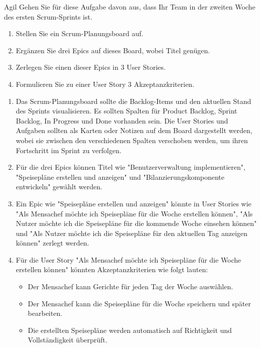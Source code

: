 \documentclass{article}
\begin{document}
\begin{exercise}{Agil}
  Gehen Sie für diese Aufgabe davon aus, dass Ihr Team in der zweiten Woche des ersten Scrum-Sprints ist.
  \begin{enumerate}
    \item Stellen Sie ein Scrum-Planungsboard auf.
    \item Ergänzen Sie drei Epics auf dieses Board, wobei Titel genügen.
    \item Zerlegen Sie einen dieser Epics in 3 User Stories.
    \item Formulieren Sie zu einer User Story 3 Akzeptanzkriterien.
  \end{enumerate}

  \begin{solution}
    \begin{enumerate}
      \item Das Scrum-Planungsboard sollte die Backlog-Items und den aktuellen Stand des Sprints visualisieren. Es sollten Spalten für Product Backlog, Sprint Backlog, In Progress und Done vorhanden sein. Die User Stories und Aufgaben sollten als Karten oder Notizen auf dem Board dargestellt werden, wobei sie zwischen den verschiedenen Spalten verschoben werden, um ihren Fortschritt im Sprint zu verfolgen.
      \item Für die drei Epics können Titel wie "Benutzerverwaltung implementieren", "Speisepläne erstellen und anzeigen" und "Bilanzierungskomponente entwickeln" gewählt werden.
      \item Ein Epic wie "Speisepläne erstellen und anzeigen" könnte in User Stories wie "Als Mensachef möchte ich Speisepläne für die Woche erstellen können", "Als Nutzer möchte ich die Speisepläne für die kommende Woche einsehen können" und "Als Nutzer möchte ich die Speisepläne für den aktuellen Tag anzeigen können" zerlegt werden.
      \item Für die User Story "Als Mensachef möchte ich Speisepläne für die Woche erstellen können" könnten Akzeptanzkriterien wie folgt lauten:
            \begin{itemize}
              \item Der Mensachef kann Gerichte für jeden Tag der Woche auswählen.
              \item Der Mensachef kann die Speisepläne für die Woche speichern und später bearbeiten.
              \item Die erstellten Speisepläne werden automatisch auf Richtigkeit und Vollständigkeit überprüft.
            \end{itemize}
    \end{enumerate}
  \end{solution}
\end{exercise}
\end{document}

